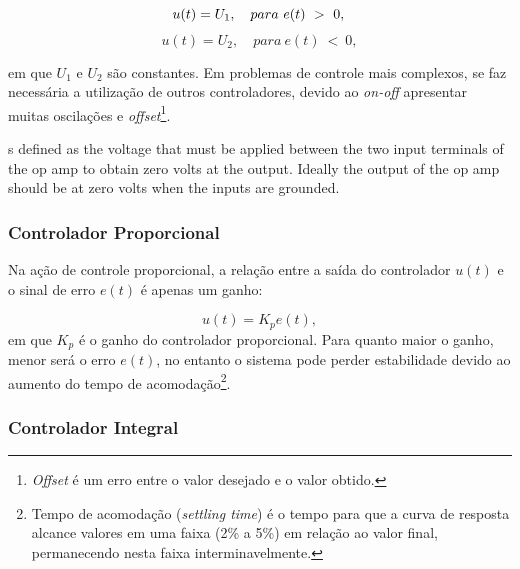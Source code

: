 
\begin{equation}
 u(t) = U_1, \quad para \ e(t) \ > \ 0, \\ 
\end{equation}
\begin{equation}
 u(t) = U_2, \quad para \ e(t) \ < \ 0,
\end{equation}

em que $U_1$ e $U_2$ são constantes.
Em problemas de controle mais complexos, se faz necessária a utilização de outros controladores, devido ao \textit{on-off} apresentar 
muitas oscilações e \textit{offset}\footnote{\textit{Offset} é um erro entre o valor desejado e o valor obtido.}.

s defined as the voltage that must be applied between the two input
terminals of the op amp to obtain zero volts at the output. Ideally the output of the op amp should
be at zero volts when the inputs are grounded. 

\subsubsection{Controlador Proporcional}


Na ação de controle proporcional, a relação entre a saída do controlador $u(t)$ e o sinal de erro $e(t)$ 
é apenas um ganho: 

\begin{equation}\label{eq:prop}
 u(t) = K_pe(t),	
\end{equation}
em que $K_p$ é o ganho do controlador proporcional. 
Para  quanto maior o ganho, menor será o erro $e(t)$, no entanto o sistema pode perder estabilidade 
devido ao aumento do 
tempo de acomodação\footnote{Tempo de acomodação (\textit{settling time}) é o tempo para que a curva de resposta alcance 
valores em uma faixa (2\% a 5\%) em relação ao valor final, permanecendo nesta faixa interminavelmente.}.

\subsubsection{Controlador Integral}

